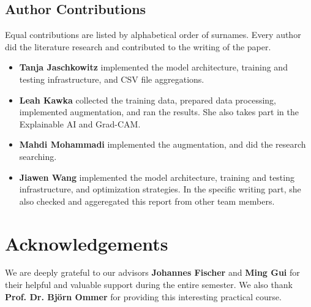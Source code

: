 \subsection*{Author Contributions}
\label{sec:author}
Equal contributions are listed by alphabetical order of surnames. 
Every author did the literature research and contributed to the writing of the paper. 

\begin{itemize}
  \item \textbf{Tanja Jaschkowitz} implemented the model architecture, training and testing infrastructure, and CSV file aggregations. 
  \item \textbf{Leah Kawka} collected the training data, prepared data processing, implemented augmentation, and ran the results. 
  She also takes part in the Explainable AI and Grad-CAM.
  \item \textbf{Mahdi Mohammadi} implemented the augmentation, and did the research searching. 
  \item \textbf{Jiawen Wang} implemented the model architecture, training and testing infrastructure, and optimization strategies. 
  In the specific writing part, she also checked and aggeregated this report from other team members.
\end{itemize}

\section*{Acknowledgements}

We are deeply grateful to our advisors \textbf{Johannes Fischer} and \textbf{Ming Gui} for their helpful and valuable support during the entire semester. 
We also thank \textbf{Prof. Dr. Björn Ommer} for providing this interesting practical course.
